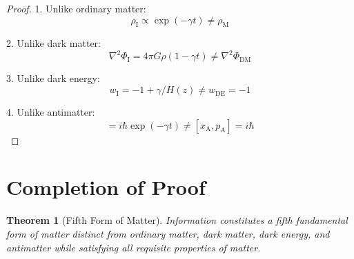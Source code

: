 \documentclass{article}
\newtheorem{theorem}{Theorem}
\begin{document}
\begin{proof}
1. Unlike ordinary matter:
\begin{equation}
\rho_\text{I} \propto \exp(-\gamma t) \neq \rho_\text{M}
\end{equation}

2. Unlike dark matter:
\begin{equation}
\nabla^2\Phi_\text{I} = 4\pi G\rho(1 - \gamma t) \neq \nabla^2\Phi_\text{DM}
\end{equation}

3. Unlike dark energy:
\begin{equation}
w_\text{I} = -1 + \gamma/H(z) \neq w_\text{DE} = -1
\end{equation}

4. Unlike antimatter:
\begin{equation}
[x_\text{I},p_\text{I}] = i\hbar\exp(-\gamma t) \neq [x_\text{A},p_\text{A}] = i\hbar
\end{equation}
\end{proof}

\section{Completion of Proof}

\begin{theorem}[Fifth Form of Matter]
Information constitutes a fifth fundamental form of matter distinct from ordinary matter, dark matter, dark energy, and antimatter while satisfying all requisite properties of matter.
\end{theorem}
\end{document}
